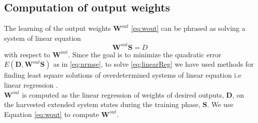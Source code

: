 \subsection{Computation of output weights}
\indent \indent
The learning of the output weights $\mathbf{W}^{out}$ \eqref{eq:wout} can be phrased as solving a system of linear equation
\begin{equation}
	\mathbf{W}^{out} \mathbf{S} = D
	\label{eq:linearReg}
	\end{equation}
with respect to $\mathbf{W}^{out}$. Since the goal is to minimize the quadratic error $E(\mathbf{D},\mathbf{W}^{out}\mathbf{S})$  as in \eqref{eq:nrmse}, to solve \eqref{eq:linearReg} we have used methods for finding least square solutions of overdetermined systems of linear equation i.e linear regression \cite{reservoirComputing}.\\

	 $\mathbf{W}^{out}$ is computed as the linear regression of weights of  
	    desired outputs, $\mathbf{D}$, on the harvested extended system states during the training phase, $\mathbf{S}$. We use Equation \eqref{eq:wout} to compute $\mathbf{W}^{out}$.
		



 